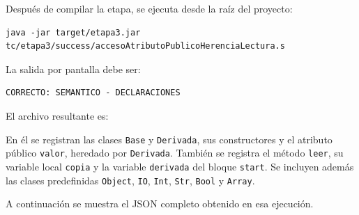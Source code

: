 Después de compilar la etapa, se ejecuta desde la raíz del proyecto:
\begin{lstlisting}[style=bnftinys]
java -jar target/etapa3.jar tc/etapa3/success/accesoAtributoPublicoHerenciaLectura.s
\end{lstlisting}
La salida por pantalla debe ser:
\begin{verbatim}
CORRECTO: SEMANTICO - DECLARACIONES
\end{verbatim}
El archivo resultante es:
\begin{quote}
\end{quote}
En él se registran las clases \texttt{Base} y \texttt{Derivada}, sus
constructores y el atributo público \texttt{valor}, heredado por
\texttt{Derivada}. También se registra el método \texttt{leer}, su
variable local \texttt{copia} y la variable \texttt{derivada} del bloque
\texttt{start}. Se incluyen además las clases predefinidas
\texttt{Object}, \texttt{IO}, \texttt{Int}, \texttt{Str},
\texttt{Bool} y \texttt{Array}.

\clearpage
A continuación se muestra el JSON completo obtenido en esa ejecución.



